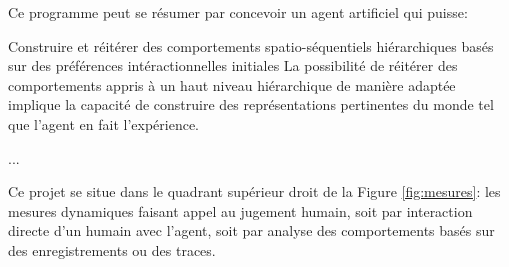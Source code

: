 
Ce programme peut se résumer par concevoir un agent artificiel qui puisse:

Construire et réitérer des comportements spatio-séquentiels hiérarchiques basés sur des préférences intéractionnelles initiales
La possibilité de réitérer des comportements appris à un haut niveau hiérarchique de manière adaptée implique la capacité de construire des représentations pertinentes du monde tel que l'agent en fait l'expérience. 

...

Ce projet se situe dans le quadrant supérieur droit de la Figure \ref{fig:mesures}: les mesures dynamiques faisant appel au jugement humain, soit par interaction directe d'un humain avec l'agent, soit par analyse des comportements basés sur des enregistrements ou des traces. 



